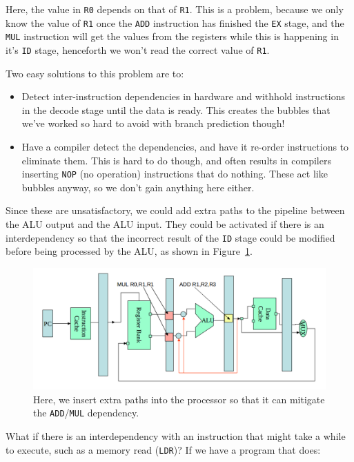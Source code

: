 Here, the value in \texttt{R0} depends on that of \texttt{R1}. This is a
problem, because we only know the value of \texttt{R1} once the \texttt{ADD}
instruction has finished the \texttt{EX} stage, and the \texttt{MUL} instruction
will get the values from the registers while this is happening in it's
\texttt{ID} stage, henceforth we won't read the correct value of \texttt{R1}.

Two easy solutions to this problem are to:

\begin{itemize}
  \item Detect inter-instruction dependencies in hardware and withhold
  instructions in the decode stage until the data is ready. This creates the
  bubbles that we've worked so hard to avoid with branch prediction though!

  \item Have a compiler detect the dependencies, and have it re-order
  instructions to eliminate them. This is hard to do though, and often results
  in compilers inserting \texttt{NOP} (no operation) instructions that do
  nothing. These act like bubbles anyway, so we don't gain anything here either.
\end{itemize}

Since these are unsatisfactory, we could add extra paths to the pipeline between
the ALU output and the ALU input. They could be activated if there is an
interdependency so that the incorrect result of the \texttt{ID} stage could be
modified before being processed by the ALU, as shown in
Figure~\ref{extra-paths}.

\begin{figure}
  \centering
  \includegraphics[width=\textwidth]{images/extra-paths}
  \caption{Here, we insert extra paths into the processor so that it can
  mitigate the \texttt{ADD}/\texttt{MUL} dependency.}
  \label{extra-paths}
\end{figure}

What if there is an interdependency with an instruction that might take a while
to execute, such as a memory read (\texttt{LDR})? If we have a program that
does:

